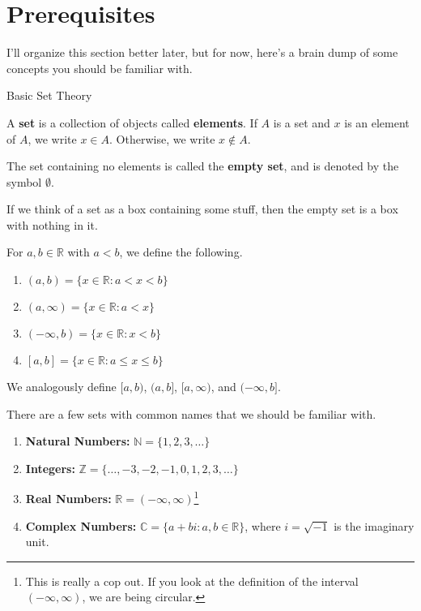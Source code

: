 \chapter{Prerequisites}
\label{chapter:prerequisites}
\thispagestyle{empty}

I'll organize this section better later, but for now, here's a brain dump of some concepts you should be familiar with.

\begin{section}{Basic Set Theory}

\begin{definition}
A \textbf{set} is a collection of objects called \textbf{elements}. If \(A\) is a set and \(x\) is an element of \(A\), we write
\(x\in A\). Otherwise, we write \(x\notin A\).
\end{definition}

\begin{definition}
The set containing no elements is called the \textbf{empty set}, and is denoted by the symbol \(\emptyset\).
\end{definition}

If we think of a set as a box containing some stuff, then the empty set is a box with nothing in it.

\begin{definition}
For \(a,b\in\mathbb{R}\) with \(a<b\), we define the following.
\begin{enumerate}
\item \((a,b)=\{x\in\mathbb{R}:a<x<b\}\)
\item \((a,\infty)=\{x\in\mathbb{R}:a<x\}\)
\item \((-\infty,b)=\{x\in\mathbb{R}:x<b\}\)
\item \([a,b]=\{x\in\mathbb{R}:a\leq x\leq b\}\)
\end{enumerate}
We analogously define \([a,b)\), \((a,b]\), \([a,\infty)\), and \((-\infty,b]\).
\end{definition}

\begin{remark}
There are a few sets with common names that we should be familiar with.
\begin{enumerate}
\item \textbf{Natural Numbers:} \(\mathbb{N}=\{1,2,3,\ldots\}\)
\item \textbf{Integers:} \(\mathbb{Z}=\{\ldots,-3,-2,-1,0,1,2,3,\ldots\}\)
\item \textbf{Real Numbers:} \(\mathbb{R}=(-\infty,\infty)\)\footnote{This is really a cop out.  If you look at the definition of the interval \((-\infty,\infty)\), we are being circular.}
\item \textbf{Complex Numbers:} \(\mathbb{C}=\{a+bi:a,b\in\mathbb{R}\}\), where \(i=\sqrt{-1}\) is the imaginary unit.
\end{enumerate}
\end{remark}


\end{section}
